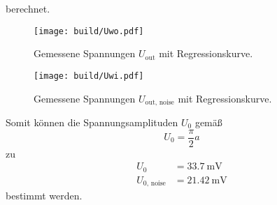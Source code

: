 berechnet.
\begin{figure}
    \centering
    \caption{Gemessene Spannungen $U_\text{out}$ mit Regressionskurve.}
    \label{fig:Uwo}
    \texttt{[image: build/Uwo.pdf]}
\end{figure}
\begin{figure}
    \centering
    \caption{Gemessene Spannungen $U_\text{out, noise}$ mit Regressionskurve.}
    \label{fig:Uwi}
    \texttt{[image: build/Uwi.pdf]}
\end{figure}
Somit können die Spannungsamplituden $U_0$ gemäß
\begin{equation*}
    U_0 = \frac{\pi}{2} a
\end{equation*}
zu 
\begin{align*}
    U_0                 & = \SI{33.7}{\milli\volt} \\
    U_{0 \text{, noise}}& = \SI{21.42}{\milli\volt}
\end{align*}
bestimmt werden.
\FloatBarrier

